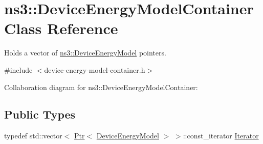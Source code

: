 \hypertarget{classns3_1_1DeviceEnergyModelContainer}{}\section{ns3\+:\+:Device\+Energy\+Model\+Container Class Reference}
\label{classns3_1_1DeviceEnergyModelContainer}


Holds a vector of \hyperlink{classns3_1_1DeviceEnergyModel}{ns3\+::\+Device\+Energy\+Model} pointers.  




{\ttfamily \#include $<$device-\/energy-\/model-\/container.\+h$>$}



Collaboration diagram for ns3\+:\+:Device\+Energy\+Model\+Container\+:
\subsection*{Public Types}
\begin{DoxyCompactItemize}
\item 
typedef std\+::vector$<$ \hyperlink{classns3_1_1Ptr}{Ptr}$<$ \hyperlink{classns3_1_1DeviceEnergyModel}{Device\+Energy\+Model} $>$ $>$\+::const\+\_\+iterator \hyperlink{classns3_1_1DeviceEnergyModelContainer_a7e8b57fa36903db5c468cc8a8e00af3b}{Iterator}
\end{DoxyCompactItemize}

